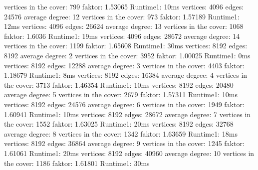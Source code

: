 \documentclass[12pt,onecolumn, notitlepage]{scrartcl}
\begin{document}
\newline vertices in the cover: 799 faktor: 1.53065 Runtime1: 10ms
\newline vertices: 4096 edges: 24576 average degree: 12 
\newline vertices in the cover: 973 faktor: 1.57189 Runtime1: 12ms
\newline vertices: 4096 edges: 26624 average degree: 13 
\newline vertices in the cover: 1068 faktor: 1.6036 Runtime1: 19ms
\newline vertices: 4096 edges: 28672 average degree: 14 
\newline vertices in the cover: 1199 faktor: 1.65608 Runtime1: 30ms \newline 
\newline vertices: 8192 edges: 8192 average degree: 2 
\newline vertices in the cover: 3952 faktor: 1.00025 Runtime1: 0ms
\newline vertices: 8192 edges: 12288 average degree: 3 
\newline vertices in the cover: 4403 faktor: 1.18679 Runtime1: 8ms
\newline vertices: 8192 edges: 16384 average degree: 4 
\newline vertices in the cover: 3713 faktor: 1.46354 Runtime1: 10ms
\newline vertices: 8192 edges: 20480 average degree: 5 
\newline vertices in the cover: 2679 faktor: 1.57311 Runtime1: 10ms
\newline vertices: 8192 edges: 24576 average degree: 6 
\newline vertices in the cover: 1949 faktor: 1.60941 Runtime1: 10ms
\newline vertices: 8192 edges: 28672 average degree: 7 
\newline vertices in the cover: 1552 faktor: 1.63025 Runtime1: 20ms
\newline vertices: 8192 edges: 32768 average degree: 8 
\newline vertices in the cover: 1342 faktor: 1.63659 Runtime1: 18ms
\newline vertices: 8192 edges: 36864 average degree: 9 
\newline vertices in the cover: 1245 faktor: 1.61061 Runtime1: 20ms
\newline vertices: 8192 edges: 40960 average degree: 10 
\newline vertices in the cover: 1186 faktor: 1.61801 Runtime1: 30ms
\end{document}
